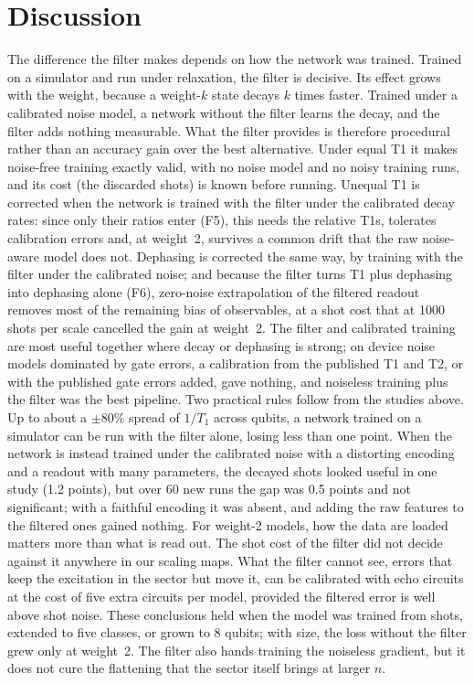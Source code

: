 \documentclass[11pt]{article}
\begin{document}
\section{Discussion}

The difference the filter makes depends on how the network was trained. Trained on a simulator and run
under relaxation, the filter is decisive. Its effect grows with the weight, because a weight-$k$ state decays
$k$ times faster. Trained under a calibrated noise model, a network without the filter learns the decay, and
the filter adds nothing measurable. What the filter provides is therefore procedural rather than an accuracy
gain over the best alternative. Under equal T1 it makes noise-free training exactly valid, with no noise
model and no noisy training runs, and its cost (the discarded shots) is known before running. Unequal T1 is corrected
when the network is trained with the filter under the calibrated decay rates: since only
their ratios enter (F5), this needs the relative T1s, tolerates calibration errors and, at weight~2, survives a
common drift that the raw noise-aware model does not. Dephasing is corrected the same way, by training with the filter
under the calibrated noise; and because the filter turns T1 plus dephasing into dephasing alone (F6), zero-noise
extrapolation of the filtered readout removes most of the remaining bias of observables, at a shot cost that at 1000
shots per scale cancelled the gain at weight~2. The filter and calibrated training are most
useful together where decay or dephasing is strong; on device noise models dominated by gate errors, a calibration
from the published T1 and T2, or with the published gate errors added, gave nothing, and noiseless training plus the filter was the best pipeline. Two practical rules follow from the studies above. Up
to about a $\pm80\%$ spread of $1/T_1$ across qubits, a network trained on a simulator can be run with the
filter alone, losing less than one point. When the network is instead trained under the calibrated noise
with a distorting encoding and a readout with many parameters, the decayed shots looked useful in one study (1.2
points), but over 60 new runs the gap was 0.5 points and not significant; with a faithful encoding it was absent,
and adding the raw features to the filtered ones gained nothing. For weight-2 models, how the data are loaded matters more than what is read out. The shot cost of the filter did not decide against it anywhere in our scaling maps. What the filter cannot see,
errors that keep the excitation in the sector but move it, can be calibrated with echo circuits at the cost of five
extra circuits per model, provided the filtered error is well above shot noise. These conclusions held when the
model was trained from shots, extended to five classes, or grown to 8 qubits; with size, the loss without the filter
grew only at weight~2. The filter also hands training the noiseless gradient, but it does not cure the flattening that
the sector itself brings at larger $n$.
\end{document}
